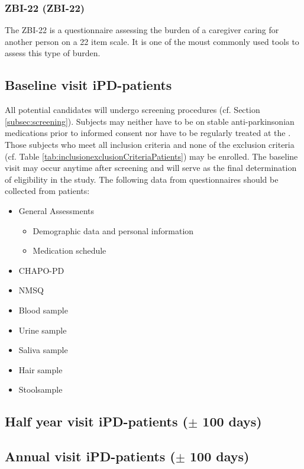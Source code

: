 \subsubsection{\acl{ZBI-22} (\acs{ZBI-22})}
The \ac{ZBI-22} is a questionnaire assessing the burden of a caregiver caring for another person on a 22 item scale. It is one of the moust commonly used tools to assess this type of burden. %

\subsection{Baseline visit \ac{iPD}-patients}
All potential candidates will undergo screening procedures (cf. Section \ref{subsec:screening}). Subjects may neither have to be on stable anti-parkinsonian medications prior to informed consent nor have to be regularly treated at the \UKGM. Those subjects who meet all inclusion criteria and none of the exclusion criteria (cf. Table \ref{tab:inclusionexclusionCriteriaPatients}) may be enrolled. The baseline visit may occur anytime after screening and will serve as the final  determination of eligibility in the study. The following data from questionnaires should be collected from patients:
\begin{itemize}
\item General Assessments
\begin{itemize}
\item Demographic data and personal information
\item Medication schedule
\end{itemize}
\item \ac{CHAPO-PD}
\item \ac{NMSQ}
\item Blood sample
\item Urine sample
\item Saliva sample
\item Hair sample
\item Stoolsample
\end{itemize}


\subsection{Half year visit \ac{iPD}-patients ($\pm$ 100 days)}

\subsection{Annual visit \ac{iPD}-patients ($\pm$ 100 days)}

